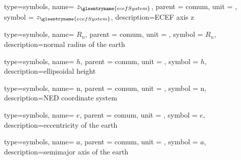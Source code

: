{type=symbols,
  name= \ensuremath{z_{\glsentryname{ecefSystem}}},
  parent = {comum},
  unit = \unexpanded{},
  symbol = \ensuremath{z_{\glsentryname{ecefSystem}}},
  description={ECEF axis z}
}

{type=symbols,
  name= \ensuremath{R_{n}},
  parent = {comum},
  unit = \unexpanded{\si{\meter}},
  symbol = \ensuremath{R_{n}},
  description={normal radius of the earth}
}

{type=symbols,
  name= \ensuremath{h},
  parent = {comum},
  unit = \unexpanded{\si{\meter}},
  symbol = \ensuremath{h},
  description={ellipsoidal height}
}

{type=symbols,
  name= \ensuremath{\mathrm{n}},
  parent = {comum},
  unit = \unexpanded{},
  symbol = \ensuremath{\mathrm{n}},
  description={NED coordinate system}
}

{type=symbols,
  name= \ensuremath{e},
  parent = {comum},
  unit = \unexpanded{},
  symbol = \ensuremath{e},
  description={eccentricity of the earth}
}

{type=symbols,
  name= \ensuremath{a},
  parent = {comum},
  unit = \unexpanded{\si{\meter}},
  symbol = \ensuremath{a},
  description={semimajor axis of the earth}
}
